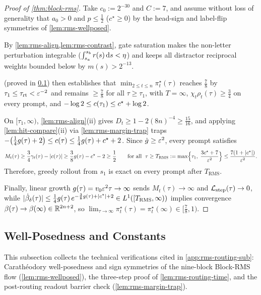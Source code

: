 \begin{proof}[Proof of \cref{thm:block-rms}]
Take $c_0 := 2^{-30}$ and $C := 7$, and assume without loss of generality that $a_0 > 0$ and $p \le \frac{1}{2}$ ($c^\star \ge 0$) by the head-sign and label-flip symmetries of \cref{lem:rms-wellposed}.

By \cref{lem:rms-align,lem:rms-contrast}, gate saturation makes the non-letter perturbation integrable ($\int_{s_a}^{s_b} r(s)\,\mathrm{d} s < \eta$) and keeps all distractor reciprocal weights bounded below by $m(s) > 2^{-13}$.

 (proved in \cref{app:rms-tech-sub}) then establishes that $\min_{2\le t\le n}\pi_t^\star(\tau)$ reaches $\frac{7}{8}$ by $\tau_1 \le \tau_{\mathrm{rt}} < \varepsilon^{-2}$ and remains $\ge \frac{7}{8}$ for all $\tau \ge \tau_1$, with $T = \infty$, $\chi_t\rho_t(\tau) \ge \frac{3}{4}$ on every prompt, and $-\log 2 \le c(\tau_1) \le c^\star + \log 2$.

On $[\tau_1, \infty)$, \cref{lem:rms-align}(ii) gives $D_t \ge 1 - 2(8n)^{-4} \ge \frac{15}{16}$, and applying \cref{lem:hit-compare}(ii) via \cref{lem:rms-margin-trap} traps $-\bigl(\frac{1}{4}g(\tau) + 2\bigr) \le c(\tau) \le \frac{1}{4}g(\tau) + c^\star + 2$. Since $\dot g \ge \varepsilon^2$, every prompt satisfies
\[
  M_t(\tau) \ge \frac{3}{4}\gamma_t(\tau) - |c(\tau)| \ge \frac{3}{8}g(\tau) - c^\star - 2 \ge \frac{1}{2}
  \qquad\text{for all }\;
  \tau \ge T_{\mathrm{RMS}} := \max\Bigl\{\tau_1,\; \frac{3c^\star + 7}{\varepsilon^2}\Bigr\} \le \frac{7(1 + |c^\star|)}{\varepsilon^2}.
\]
Therefore, greedy rollout from $s_1$ is exact on every prompt after $T_{\mathrm{RMS}}$.

Finally, linear growth $g(\tau) = v_0\varepsilon^2\tau \to \infty$ sends $M_t(\tau) \to \infty$ and $\mathcal L_{\mathrm{step}}(\tau) \to 0$, while $|\dot{\beta}_\delta(\tau)| \le \frac{1}{4}g(\tau)\,e^{-\frac{3}{8}g(\tau) + |c^\star| + 2} \in L^1([T_{\mathrm{RMS}}, \infty))$ implies convergence $\beta(\tau) \to \beta(\infty) \in \mathbb R^{2n+2}$, so $\lim_{\tau\to\infty}\pi_t^\star(\tau) = \pi_t^\star(\infty) \in [\frac{7}{8}, 1)$.
\end{proof}

\subsection{Well-Posedness and Constants}
\label{app:rms-tech-sub}

This subsection collects the technical verifications cited in \cref{app:rms-routing-sub}: Carath\'eodory well-posedness and sign symmetries of the nine-block Block-RMS flow (\cref{lem:rms-wellposed}), the three-step proof of \cref{lem:rms-routing-time}, and the post-routing readout barrier check (\cref{lem:rms-margin-trap}).

